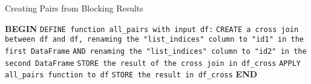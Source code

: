 \documentclass{article}
\begin{document}
\begin{algorithm}
\caption{Creating Pairs from Blocking Results}
\begin{algorithmic}[1]
\State \textbf{BEGIN}
\State \hspace{1cm} \texttt{DEFINE function all\_pairs with input df:}
\State \hspace{2cm} \texttt{CREATE a cross join between df and df, renaming the "list\_indices" column to "id1" in the first DataFrame}
\State \hspace{2cm} \texttt{AND renaming the "list\_indices" column to "id2" in the second DataFrame}
\State \hspace{1cm} \texttt{STORE the result of the cross join in df\_cross}
\State \hspace{1cm} \texttt{APPLY all\_pairs function to df}
\State \hspace{1cm} \texttt{STORE the result in df\_cross}
\State \textbf{END}
\end{algorithmic}
\end{algorithm}
\end{document}
